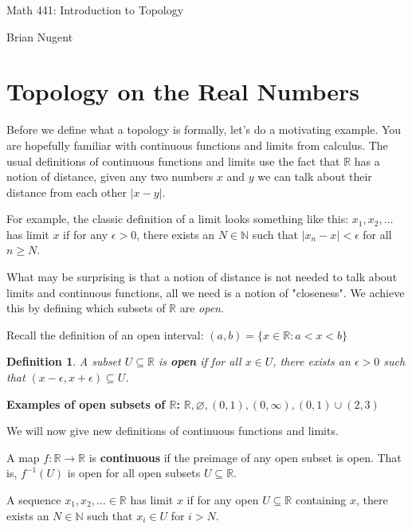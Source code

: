\documentclass[a4paper]{article}
\newcommand{\R}{\mathbb{R}}
\newcommand{\jump}{\vspace{0.3cm}}
\newtheorem{definition}[theorem]{Definition}
\numberwithin{theorem}{section}
\begin{document}
\begin{center}
    {\huge Math 441: Introduction to Topology} 

    Brian Nugent
\end{center}
\jump

\tableofcontents

\section{Topology on the Real Numbers}

Before we define what a topology is formally, let's do a motivating example. You are hopefully familiar with continuous functions and limits from calculus. The usual definitions of continuous functions and limits use the fact that $\mathbb{R}$ has a notion of distance, given any two numbers $x$ and $y$ we can talk about their distance from each other $|x-y|$.

For example, the classic definition of a limit looks something like this: $x_1,x_2, \dots$ has limit $x$ if for any $\epsilon > 0$, there exists an $N \in \mathbb{N}$ such that $|x_n - x| < \epsilon$ for all $n \geq N$.

What may be surprising is that a notion of distance is not needed to talk about limits and continuous functions, all we need is a notion of "closeness". We achieve this by defining which subsets of $\mathbb{R}$ are \textit{open}.

Recall the definition of an open interval: $(a,b) = \{x \in \R : a < x < b \}$


\begin{definition}
A subset $U \subseteq \R$ is \textbf{open} if for all $x \in U$, there exists an $\epsilon > 0$ such that $(x-\epsilon,x+\epsilon) \subseteq U$.
\end{definition}

\textbf{Examples of open subsets of $\mathbb{R}$:} $\R, \varnothing, (0,1), (0, \infty), (0,1) \cup (2,3)$

We will now give new definitions of continuous functions and limits.

A map $f: \R \rightarrow \R$ is \textbf{continuous} if the preimage of any open subset is open. That is, $f^{-1}(U)$ is open for all open subsets $U \subseteq \R$.

A sequence $x_1,x_2,\ldots \in \mathbb{R}$ has limit $x$ if for any open $U \subseteq \mathbb{R}$ containing $x$, there exists an $N \in \mathbb{N}$ such that $x_i \in U$ for $i > N$.
\end{document}
